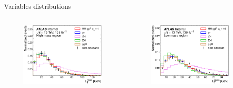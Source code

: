 \begin{frame}{Variables distributions}
\begin{columns}
\begin{figure}
    \centering
    \includegraphics[width=1.\textwidth]{BackUp/Part3/Img/var_SM_met_pt.pdf}
\end{figure}
\begin{figure}
    \centering
    \includegraphics[width=1.\textwidth]{BackUp/Part3/Img/var_BSM_met_pt.pdf}
\end{figure}
\end{columns}
\end{frame}


